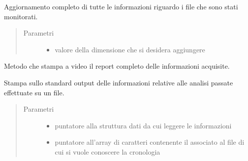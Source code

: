 \documentclass[letterpaper,10pt,italian,openany,oneside]{sphinxmanual}
\begin{document}

\begin{fulllineitems}
\label{\detokenize{code/scan:c.updateStats}}
Aggiornamento completo di tutte le informazioni riguardo i file che sono stati monitorati.
\begin{quote}\begin{description}
\item[{Parametri}] \leavevmode\begin{itemize}
\item {} 
 \textendash{} valore della dimensione che si desidera aggiungere

\end{itemize}

\end{description}\end{quote}

\end{fulllineitems}


\begin{fulllineitems}
\label{\detokenize{code/scan:c.printStats}}
Metodo che stampa a video il report completo delle informazioni acquisite.

\end{fulllineitems}


\begin{fulllineitems}
\label{\detokenize{code/scan:c.printHistory}}
Stampa sullo standard output delle informazioni relative alle analisi passate effettuate su un file.
\begin{quote}\begin{description}
\item[{Parametri}] \leavevmode\begin{itemize}
\item {} 
 \textendash{} puntatore alla struttura dati da cui leggere le informazioni

\item {} 
 \textendash{} puntatore all’array di caratteri contenente il associato al file di cui si vuole conoscere la cronologia

\end{itemize}

\end{description}\end{quote}

\end{fulllineitems}
\end{document}
